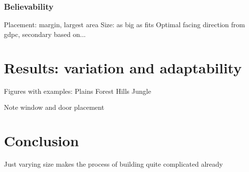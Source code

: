 \documentclass[10pt]{article}
\begin{document}
\subsubsection{Believability}
Placement: margin, largest area
Size: as big as fits
Optimal facing direction from gdpc, secondary based on...

\section{Results: variation and adaptability}
Figures with examples:
Plains
Forest
Hills
Jungle

Note window and door placement

\section{Conclusion}
Just varying size makes the process of building quite complicated already
\end{document}
